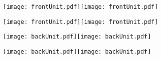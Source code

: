 \documentclass{article}
\begin{document}
\hspace{-.205in}\texttt{[image: frontUnit.pdf]}\texttt{[image: frontUnit.pdf]}

\vspace{1in}

\hspace{-.205in}\texttt{[image: frontUnit.pdf]}\texttt{[image: frontUnit.pdf]}

\newpage

\hspace{-.205in}\texttt{[image: backUnit.pdf]}\texttt{[image: backUnit.pdf]}

\vspace{1in}

\hspace{-.205in}\texttt{[image: backUnit.pdf]}\texttt{[image: backUnit.pdf]}
\end{document}

